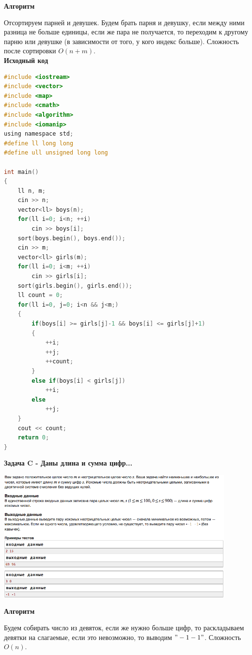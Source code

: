 \documentclass[a4paper,12pt]{article}
\begin{document}
\newpage
\textbf{{\large Алгоритм}}

Отсортируем парней и девушек. Будем брать парня и девушку, если между ними разница не больше единицы, если же пара не получается, то переходим к другому парню или девушке (в зависимости от того, у кого индекс больше). Сложность после сортировки $O(n+m)$.\\

\textbf{{\large Исходный код}} \\
\begin{lstlisting}[language=C]
#include <iostream>
#include <vector>
#include <map>
#include <cmath>
#include <algorithm>
#include <iomanip>
using namespace std;
#define ll long long
#define ull unsigned long long

int main()
{
    ll n, m;
    cin >> n;
    vector<ll> boys(n);
    for(ll i=0; i<n; ++i)
        cin >> boys[i];
    sort(boys.begin(), boys.end());
    cin >> m;
    vector<ll> girls(m);
    for(ll i=0; i<m; ++i)
        cin >> girls[i];
    sort(girls.begin(), girls.end());
    ll count = 0;
    for(ll i=0, j=0; i<n && j<m;)
    {
        if(boys[i] >= girls[j]-1 && boys[i] <= girls[j]+1)
        {
            ++i;
            ++j;
            ++count;
        }
        else if(boys[i] < girls[j])
            ++i;
        else
            ++j;
    }
    cout << count;
    return 0;
}
\end{lstlisting}

\newpage
\textbf{{\large Задача C - Даны длина и сумма цифр...}} \\
\begin{center}
\includegraphics[width=0.9\textwidth]{C_277_5/C_277_5_C.png}\\ [1cm]
\end{center}

\textbf{{\large Алгоритм}}

Будем собирать число из девяток, если же нужно больше цифр, то раскладываем девятки на слагаемые, если это невозможно, то выводим $"-1 -1"$. Сложность $O(n)$. \\
\end{document}

